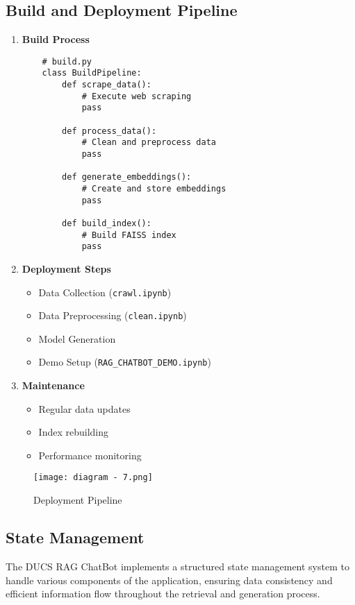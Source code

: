 \documentclass[12pt,a4paper]{report}
\begin{document}
\subsection{Build and Deployment Pipeline}
\begin{enumerate}
    \item \textbf{Build Process}
    \begin{verbatim}
    # build.py
    class BuildPipeline:
        def scrape_data():
            # Execute web scraping
            pass

        def process_data():
            # Clean and preprocess data
            pass

        def generate_embeddings():
            # Create and store embeddings
            pass

        def build_index():
            # Build FAISS index
            pass
    \end{verbatim}

    \item \textbf{Deployment Steps}
    \begin{itemize}
        \item Data Collection (\texttt{crawl.ipynb})
        \item Data Preprocessing (\texttt{clean.ipynb})
        \item Model Generation
        \item Demo Setup (\texttt{RAG\_CHATBOT\_DEMO.ipynb})
    \end{itemize}

    \item \textbf{Maintenance}
    \begin{itemize}
        \item Regular data updates
        \item Index rebuilding
        \item Performance monitoring
    \end{itemize}
\end{enumerate}

\begin{figure}[htbp]
    \centering
    \texttt{[image: diagram - 7.png]}
    \caption{Deployment Pipeline}
    \label{fig:development-environment}
\end{figure}




\subsection{State Management}
The DUCS RAG ChatBot implements a structured state management system to handle various components of the application, ensuring data consistency and efficient information flow throughout the retrieval and generation process.
\end{document}
